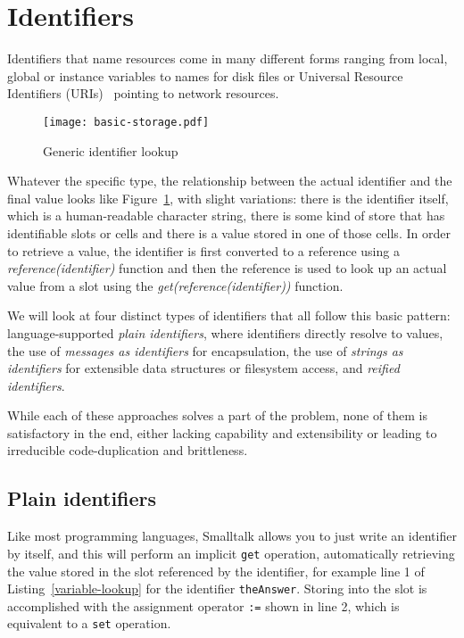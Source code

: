 \documentclass[preprint,authoryear]{llncs}
\begin{document}





\section{Identifiers}
\label{identifiers}


Identifiers that name resources come in many different forms ranging from local,
global or instance variables to names for disk files or Universal Resource Identifiers (URIs)~\cite{rfc3986} pointing to network resources.

\begin{figure}[htbp]
\begin{center}
\texttt{[image: basic-storage.pdf]}
\caption{Generic identifier lookup}
\label{identifier-eval}
\end{center}
\end{figure}

Whatever the specific type, the relationship between the actual identifier and the
final value looks like Figure~\ref{identifier-eval}, with slight variations:   there is 
the identifier itself, which is a human-readable character string, there is some kind
of store that has identifiable slots or cells and there is a value stored in one of those
cells.   In order to retrieve a value, the identifier is first converted to a reference using a
 \emph{reference(identifier)} function and then the reference is used to look up an actual
value from a slot using the \emph{get(reference(identifier))} function.


We will look at four distinct types of identifiers that all follow this basic pattern:  language-supported 
\emph{plain identifiers}, where identifiers directly resolve to values, the use of \emph{messages as identifiers} 
for encapsulation, the use of \emph{strings as identifiers} for extensible data structures or filesystem access, and
\emph{reified identifiers}.

 While each of these approaches solves a part of the problem,
none of them is satisfactory in the end, either lacking capability and extensibility or leading to
irreducible code-duplication and brittleness.

\subsection{Plain identifiers}
\label{direct-reference}
Like most programming languages, Smalltalk allows you to just write 
an identifier by itself, and this will perform an implicit {\tt get} operation, automatically retrieving the value stored in the slot referenced by the identifier, for
example line 1 of Listing~\ref{variable-lookup} for the identifier {\tt theAnswer}.
Storing into the slot is accomplished with
the assignment operator {\tt :=} shown in line 2, which is equivalent to a {\tt set} operation.
\end{document}
